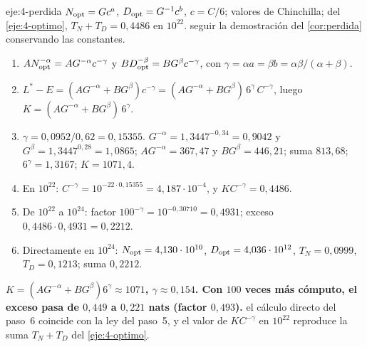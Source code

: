\begin{solucion}{eje:4-perdida}
\datos $N_{\mathrm{opt}}=Gc^{a}$, $D_{\mathrm{opt}}=G^{-1}c^{b}$, $c=C/6$; valores de Chinchilla; del \cref{eje:4-optimo}, $T_N+T_D=0{,}4486$ en $10^{22}$.
\planteamiento seguir la demostración del \cref{cor:perdida} conservando las constantes.
\pasos
\begin{enumerate}[label=\arabic*.]
  \item $AN_{\mathrm{opt}}^{-\alpha}=AG^{-\alpha}c^{-\gamma}$ y $BD_{\mathrm{opt}}^{-\beta}=BG^{\beta}c^{-\gamma}$, con $\gamma=\alpha a=\beta b=\alpha\beta/(\alpha+\beta)$.
  \item $L^{*}-E=(AG^{-\alpha}+BG^{\beta})c^{-\gamma}=(AG^{-\alpha}+BG^{\beta})\,6^{\gamma}\,C^{-\gamma}$, luego $K=(AG^{-\alpha}+BG^{\beta})\,6^{\gamma}$.
  \item $\gamma=0{,}0952/0{,}62=0{,}15355$. $G^{-\alpha}=1{,}3447^{-0{,}34}=0{,}9042$ y $G^{\beta}=1{,}3447^{0{,}28}=1{,}0865$; $AG^{-\alpha}=367{,}47$ y $BG^{\beta}=446{,}21$; suma $813{,}68$; $6^{\gamma}=1{,}3167$; $K=1071{,}4$.
  \item En $10^{22}$: $C^{-\gamma}=10^{-22\cdot 0{,}15355}=4{,}187\cdot 10^{-4}$, y $K C^{-\gamma}=0{,}4486$.
  \item De $10^{22}$ a $10^{24}$: factor $100^{-\gamma}=10^{-0{,}30710}=0{,}4931$; exceso $0{,}4486\cdot 0{,}4931=0{,}2212$.
  \item Directamente en $10^{24}$: $N_{\mathrm{opt}}=4{,}130\cdot 10^{10}$, $D_{\mathrm{opt}}=4{,}036\cdot 10^{12}$, $T_N=0{,}0999$, $T_D=0{,}1213$; suma $0{,}2212$.
\end{enumerate}
\resultado \textbf{$K=(AG^{-\alpha}+BG^{\beta})6^{\gamma}\approx 1071$, $\gamma\approx 0{,}154$. Con $100$ veces más cómputo, el exceso pasa de $0{,}449$ a $0{,}221$ nats (factor $0{,}493$).}
\comprobacion el cálculo directo del paso~6 coincide con la ley del paso~5, y el valor de $K C^{-\gamma}$ en $10^{22}$ reproduce la suma $T_N+T_D$ del \cref{eje:4-optimo}.
\end{solucion}

